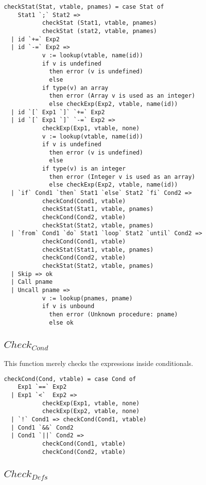 \begin{verbatim}
checkStat(Stat, vtable, pnames) = case Stat of
    Stat1 `;` Stat2 =>
           checkStat (Stat1, vtable, pnames)
           checkStat (stat2, vtable, pnames)
  | id `+=` Exp2
  | id `-=` Exp2 =>
           v := lookup(vtable, name(id))
           if v is undefined
             then error (v is undefined)
             else
           if type(v) an array
             then error (Array v is used as an integer)
             else checkExp(Exp2, vtable, name(id))
  | id `[` Exp1 `]` `+=` Exp2
  | id `[` Exp1 `]` `-=` Exp2 =>
           checkExp(Exp1, vtable, none)
           v := lookup(vtable, name(id))
           if v is undefined
             then error (v is undefined)
             else
           if type(v) is an integer
             then error (Integer v is used as an array)
             else checkExp(Exp2, vtable, name(id))
  | `if` Cond1 `then` Stat1 `else` Stat2 `fi` Cond2 =>
           checkCond(Cond1, vtable)
           checkStat(Stat1, vtable, pnames)
           checkCond(Cond2, vtable)
           checkStat(Stat2, vtable, pnames)
  | `from` Cond1 `do` Stat1 `loop` Stat2 `until` Cond2 =>
           checkCond(Cond1, vtable)
           checkStat(Stat1, vtable, pnames)
           checkCond(Cond2, vtable)
           checkStat(Stat2, vtable, pnames)
  | Skip => ok
  | Call pname
  | Uncall pname =>
           v := lookup(pnames, pname)
           if v is unbound
             then error (Unknown procedure: pname)
             else ok
\end{verbatim}

\subsection{$Check_{Cond}$}

This function merely checks the expressions inside conditionals.

\begin{verbatim}
checkCond(Cond, vtable) = case Cond of
    Exp1 `==` Exp2
  | Exp1 `<`  Exp2 =>
           checkExp(Exp1, vtable, none)
           checkExp(Exp2, vtable, none)
  | `!` Cond1 => checkCond(Cond1, vtable)
  | Cond1 `&&` Cond2
  | Cond1 `||` Cond2 =>
           checkCond(Cond1, vtable)
           checkCond(Cond2, vtable)
\end{verbatim}

\subsection{$Check_{Defs}$}

